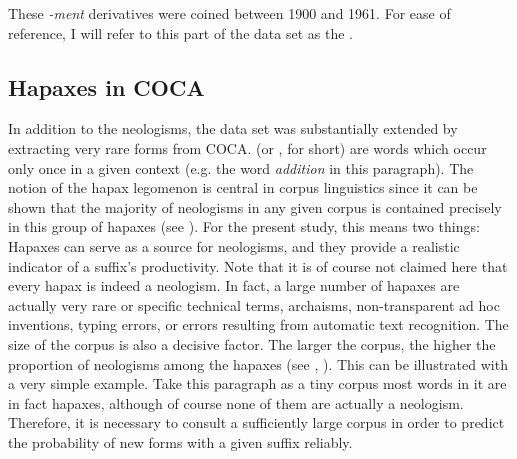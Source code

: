 \noindent These \textit{-ment} derivatives were coined between 1900 and 1961. For ease of reference, I will refer to this part of the data set as the . 

\subsection{Hapaxes in COCA}
\label{sec:meth-neo-COCA}
In addition to the  neologisms, the data set was substantially extended by extracting very rare forms from COCA.  (or , for short) are words which occur only once in a given context (e.g. the word \textit{addition} in this paragraph). The notion of the hapax legomenon is central in corpus linguistics since it can be shown that the majority of neologisms in any given corpus is contained precisely in this group of hapaxes (see \citealt [68] {Plag.2003}). For the present study, this means two things: Hapaxes can serve as a source for neologisms, and they provide a realistic indicator of a suffix's productivity. 
Note that it is of course not claimed here that every hapax is indeed a neologism. In fact, a large number of hapaxes are actually very rare or specific technical terms, archaisms, non-transparent ad hoc inventions, typing errors, or errors resulting from automatic text recognition. The size of the corpus is also a decisive factor. The larger the corpus, the higher the proportion of neologisms among the hapaxes (see \citealt{Baayen.1996}, \citealt{Baayen.2009}). This can be illustrated with a very simple example. Take this paragraph as a tiny corpus  \textendash{}  most words in it are in fact hapaxes, although of course none of them are actually a neologism. Therefore, it is necessary to consult a sufficiently large corpus in order to predict the probability of new forms with a given suffix reliably. 


